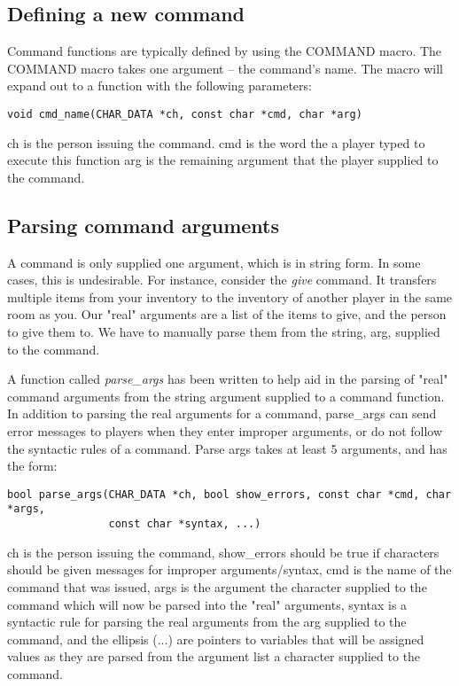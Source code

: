 \documentclass[fignum,doc]{article}
\begin{document}
\begin{doublespace}
\subsection{Defining a new command}
Command functions are typically defined by using the COMMAND macro. The COMMAND macro takes one argument -- the command's name. The macro will expand out to a function with the following parameters:
\begin{verbatim}
void cmd_name(CHAR_DATA *ch, const char *cmd, char *arg)
\end{verbatim}
ch is the person issuing the command. cmd is the word the a player typed to execute this function arg is the remaining argument that the player supplied to the command. 



\subsection{Parsing command arguments}
A command is only supplied one argument, which is in string form. In some cases, this is undesirable. For instance, consider the {\it give} command. It transfers multiple items from your inventory to the inventory of another player in the same room as you. Our "real" arguments are a list of the items to give, and the person to give them to. We have to manually parse them from the string, arg, supplied to the command.

A function called {\it parse\_args} has been written to help aid in the parsing of "real" command arguments from the string argument supplied to a command function. In addition to parsing the real arguments for a command, parse\_args can send error messages to players when they enter improper arguments, or do not follow the syntactic rules of a command. Parse args takes at least 5 arguments, and has the form:
\begin{verbatim}
bool parse_args(CHAR_DATA *ch, bool show_errors, const char *cmd, char *args,
                const char *syntax, ...)
\end{verbatim}
ch is the person issuing the command, show\_errors should be true if characters should be given messages for improper arguments/syntax, cmd is the name of the command that was issued, args is the argument the character supplied to the command which will now be parsed into the "real" arguments, syntax is a syntactic rule for parsing the real arguments from the arg supplied to the command, and the ellipsis (...) are pointers to variables that will be assigned values as they are parsed from the argument list a character supplied to the command.


\end{doublespace}
\end{document}
